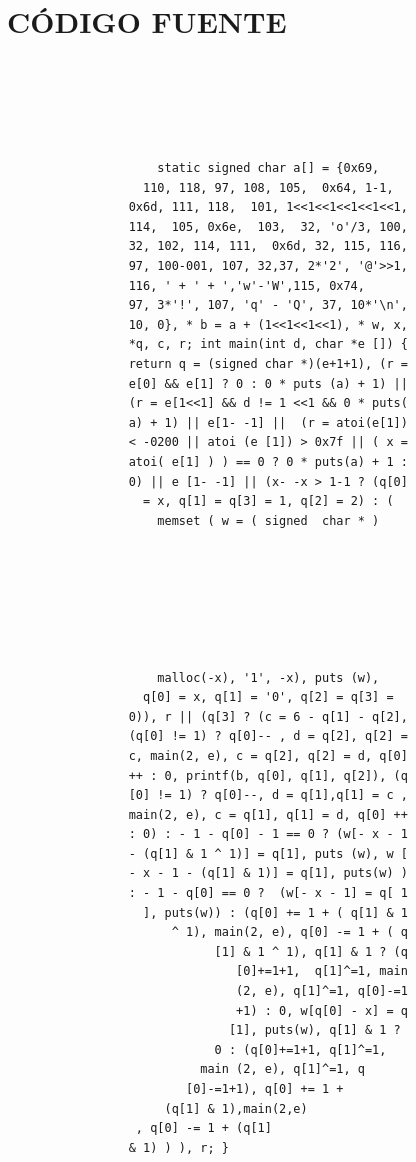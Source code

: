 \documentclass[10pt]{beamer}
\begin{document}
\section{CÓDIGO FUENTE} 
    \begin{lstlisting}[style=CStyle] 





                     static signed char a[] = {0x69,
                   110, 118, 97, 108, 105,  0x64, 1-1,
                 0x6d, 111, 118,  101, 1<<1<<1<<1<<1<<1,
                 114,  105, 0x6e,  103,  32, 'o'/3, 100,
                 32, 102, 114, 111,  0x6d, 32, 115, 116,
                 97, 100-001, 107, 32,37, 2*'2', '@'>>1,
                 116, ' + ' + ','w'-'W',115, 0x74,
                 97, 3*'!', 107, 'q' - 'Q', 37, 10*'\n',
                 10, 0}, * b = a + (1<<1<<1<<1), * w, x,
                 *q, c, r; int main(int d, char *e []) {
                 return q = (signed char *)(e+1+1), (r =
                 e[0] && e[1] ? 0 : 0 * puts (a) + 1) ||
                 (r = e[1<<1] && d != 1 <<1 && 0 * puts(
                 a) + 1) || e[1- -1] ||  (r = atoi(e[1])
                 < -0200 || atoi (e [1]) > 0x7f || ( x =
                 atoi( e[1] ) ) == 0 ? 0 * puts(a) + 1 :
                 0) || e [1- -1] || (x- -x > 1-1 ? (q[0]
                   = x, q[1] = q[3] = 1, q[2] = 2) : (
                     memset ( w = ( signed  char * )







                     malloc(-x), '1', -x), puts (w),
                   q[0] = x, q[1] = '0', q[2] = q[3] =
                 0)), r || (q[3] ? (c = 6 - q[1] - q[2],
                 (q[0] != 1) ? q[0]-- , d = q[2], q[2] =
                 c, main(2, e), c = q[2], q[2] = d, q[0]
                 ++ : 0, printf(b, q[0], q[1], q[2]), (q
                 [0] != 1) ? q[0]--, d = q[1],q[1] = c ,
                 main(2, e), c = q[1], q[1] = d, q[0] ++
                 : 0) : - 1 - q[0] - 1 == 0 ? (w[- x - 1
                 - (q[1] & 1 ^ 1)] = q[1], puts (w), w [
                 - x - 1 - (q[1] & 1)] = q[1], puts(w) )
                 : - 1 - q[0] == 0 ?  (w[- x - 1] = q[ 1
                   ], puts(w)) : (q[0] += 1 + ( q[1] & 1
                       ^ 1), main(2, e), q[0] -= 1 + ( q
                             [1] & 1 ^ 1), q[1] & 1 ? (q
                                [0]+=1+1,  q[1]^=1, main
                                (2, e), q[1]^=1, q[0]-=1
                                +1) : 0, w[q[0] - x] = q
                               [1], puts(w), q[1] & 1 ?
                             0 : (q[0]+=1+1, q[1]^=1,
                           main (2, e), q[1]^=1, q
                         [0]-=1+1), q[0] += 1 +
                      (q[1] & 1),main(2,e)
                  , q[0] -= 1 + (q[1]
                 & 1) ) ), r; }




\end{lstlisting}
\end{document}
